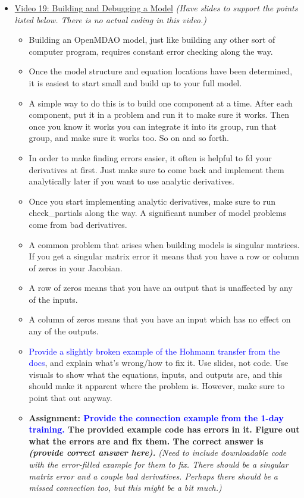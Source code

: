 \documentclass[12pt, letterpaper]{article}
\begin{document}
\begin{itemize}
	\item \underline{Video 19: Building and Debugging a Model} \textit{(Have slides to support the points listed below. There is no  actual coding in this video.)}
		\begin{itemize}
			\item Building an OpenMDAO model, just like building any other sort of computer program, requires constant error checking along the way.
			\item Once the model structure and equation locations have been determined, it is easiest to start small and build up to your full model.
			\item A simple way to do this is to build one component at a time. After each component, put it in a problem and run it to make sure it works. Then once you know it works you can integrate it into its group, run that group, and make sure it works too. So on and so forth.
			\item In order to make finding errors easier, it often is helpful to fd your derivatives at first. Just make sure to come back and implement them analytically later if you want to use analytic derivatives.
			\item Once you start implementing analytic derivatives, make sure to run check\_partials along the way. A significant number of model problems come from bad derivatives.
			\item A common problem that arises when building models is singular matrices. If you get a singular matrix error it means that you have a row or column of zeros in your Jacobian.
			\item A row of zeros means that you have an output that is unaffected by any of the inputs.
			\item A column of zeros means that you have an input which has no effect on any of the outputs.
			\item \textcolor{blue}{Provide a slightly broken example of the Hohmann transfer from the docs}, and explain what’s wrong/how to fix it. Use slides, not code. Use visuals to show what the equations, inputs, and outputs are, and this should make it apparent where the problem is. However, make sure to point that out anyway.
			\item \textbf{Assignment: \textcolor{blue}{Provide the connection example from the 1-day training.} The provided example code has errors in it. Figure out what the errors are and fix them. The correct answer is \textit{(provide correct answer here).}} \textit{(Need to include downloadable code with the error-filled example for them to fix. There should be a singular matrix error and a couple bad derivatives. Perhaps there should be a missed connection too, but this might be a bit much.)}
		\end{itemize}
		

\end{itemize}
\end{document}

